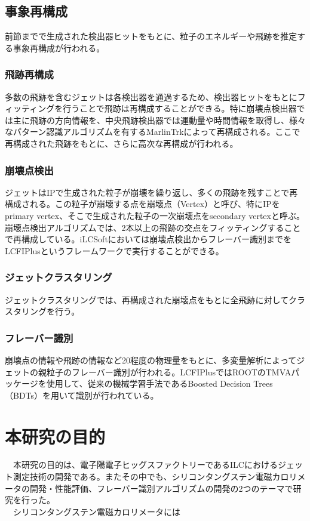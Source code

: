 \subsection{事象再構成}
前節までで生成された検出器ヒットをもとに、粒子のエネルギーや飛跡を推定する事象再構成が行われる。
\subsubsection{飛跡再構成}
多数の飛跡を含むジェットは各検出器を通過するため、検出器ヒットをもとにフィッティングを行うことで飛跡は再構成することができる。特に崩壊点検出器では主に飛跡の方向情報を、中央飛跡検出器では運動量や時間情報を取得し、様々なパターン認識アルゴリズムを有するMarlinTrkによって再構成される。ここで再構成された飛跡をもとに、さらに高次な再構成が行われる。
\subsubsection{崩壊点検出}
ジェットはIPで生成された粒子が崩壊を繰り返し、多くの飛跡を残すことで再構成される。この粒子が崩壊する点を崩壊点（Vertex）と呼び、特にIPをprimary vertex、そこで生成された粒子の一次崩壊点をsecondary vertexと呼ぶ。崩壊点検出アルゴリズムでは、2本以上の飛跡の交点をフィッティングすることで再構成している。iLCSoftにおいては崩壊点検出からフレーバー識別までをLCFIPlusというフレームワークで実行することができる。
\subsubsection{ジェットクラスタリング}
ジェットクラスタリングでは、再構成された崩壊点をもとに全飛跡に対してクラスタリングを行う。
\subsubsection{フレーバー識別}
崩壊点の情報や飛跡の情報など20程度の物理量をもとに、多変量解析によってジェットの親粒子のフレーバー識別が行われる。LCFIPlusではROOTのTMVAパッケージを使用して、従来の機械学習手法であるBoosted Decision Trees（BDTs）を用いて識別が行われている。
\section{本研究の目的}
　本研究の目的は、電子陽電子ヒッグスファクトリーであるILCにおけるジェット測定技術の開発である。またその中でも、シリコンタングステン電磁カロリメータの開発・性能評価、フレーバー識別アルゴリズムの開発の2つのテーマで研究を行った。\\
　シリコンタングステン電磁カロリメータには